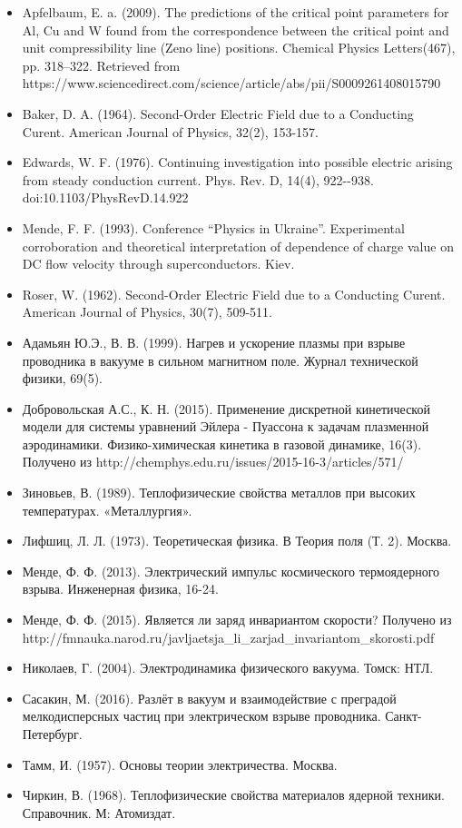\documentclass[11pt]{article}
\makeatletter
\providecommand{\tightlist}{%
      \setlength{\itemsep}{0pt}\setlength{\parskip}{0pt}}
\newcommand{\boxspacing}{\kern\kvtcb@left@rule\kern\kvtcb@boxsep}
\newcommand{\prompt}[4]{
        {\ttfamily\llap{{\color{#2}[#3]:\hspace{3pt}#4}}\vspace{-\baselineskip}}
    }
\makeatother
\begin{document}
\begin{itemize}
\tightlist
\item
  Apfelbaum, E. a. (2009). The predictions of the critical point
  parameters for Al, Cu and W found from the correspondence between the
  critical point and unit compressibility line (Zeno line) positions.
  Chemical Physics Letters(467), pp. 318--322. Retrieved from
  https://www.sciencedirect.com/science/article/abs/pii/S0009261408015790
\item
  Baker, D. A. (1964). Second-Order Electric Field due to a Conducting
  Curent. American Journal of Physics, 32(2), 153-157.
\item
  Edwards, W. F. (1976). Continuing investigation into possible electric
  arising from steady conduction current. Phys. Rev. D, 14(4),
  922-\/-938. doi:10.1103/PhysRevD.14.922
\item
  Mende, F. F. (1993). Conference ``Physics in Ukraine''. Experimental
  corroboration and theoretical interpretation of dependence of charge
  value on DC flow velocity through superconductors. Kiev.
\item
  Roser, W. (1962). Second-Order Electric Field due to a Conducting
  Curent. American Journal of Physics, 30(7), 509-511.
\item
  Адамьян Ю.Э., В. В. (1999). Нагрев и ускорение плазмы при взрыве
  проводника в вакууме в сильном магнитном поле. Журнал технической
  физики, 69(5).
\item
  Добровольская А.С., К. Н. (2015). Применение дискретной кинетической
  модели для системы уравнений Эйлера - Пуассона к задачам плазменной
  аэродинамики. Физико-химическая кинетика в газовой динамике, 16(3).
  Получено из http://chemphys.edu.ru/issues/2015-16-3/articles/571/
\item
  Зиновьев, В. (1989). Теплофизические свойства металлов при высоких
  температурах. «Металлургия».
\item
  Лифшиц, Л. Л. (1973). Теоретическая физика. В Теория поля (Т. 2).
  Москва.
\item
  Менде, Ф. Ф. (2013). Электрический импульс космического термоядерного
  взрыва. Инженерная физика, 16-24.
\item
  Менде, Ф. Ф. (2015). Является ли заряд инвариантом скорости? Получено
  из
  http://fmnauka.narod.ru/javljaetsja\_li\_zarjad\_invariantom\_skorosti.pdf
\item
  Николаев, Г. (2004). Электродинамика физического вакуума. Томск: НТЛ.
\item
  Сасакин, М. (2016). Разлёт в вакуум и взаимодействие с преградой
  мелкодисперсных частиц при электрическом взрыве проводника.
  Санкт-Петербург.
\item
  Тамм, И. (1957). Основы теории электричества. Москва.
\item
  Чиркин, В. (1968). Теплофизические свойства материалов ядерной
  техники. Справочник. М: Атомиздат.
\end{itemize}

    \begin{tcolorbox}[breakable, size=fbox, boxrule=1pt, pad at break*=1mm,colback=cellbackground, colframe=cellborder]
\prompt{In}{incolor}{ }{\boxspacing}
\begin{Verbatim}[commandchars=\\\{\}]

\end{Verbatim}
\end{tcolorbox}


    
    
    
\end{document}
